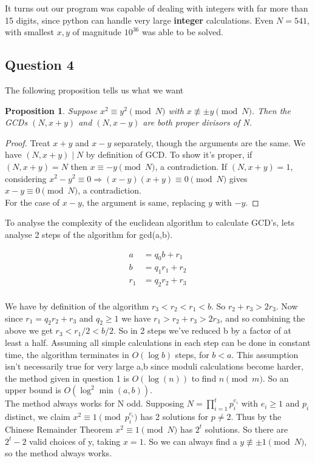 \documentclass[10pt,a4paper]{report}
\newtheorem*{prop}{Proposition}
\begin{document}
It turns out our program was capable of dealing with integers with far more than 15 digits, since python can handle very large \textbf{integer} calculations. Even $N=541$, with smallest $x,y$ of magnitude $10^{36}$ was able to be solved.
 \subsection*{Question 4}

The following proposition tells us what we want

\begin{prop}
Suppose $x^2  \equiv y^2 \pmod N$ with $x \not\equiv \pm y \pmod N$. Then the GCDs $(N, x + y)$ and $(N, x - y)$ are both proper divisors of N.
\end{prop}
\begin{proof}
Treat $x+y$ and $x-y$ separately, though the arguments are the same.
We have $(N, x+y) \mid N$ by definition of GCD. To show it's proper, if $(N, x+y)=N$ then $x\equiv-y\pmod N$, a contradiction. If $(N, x+y)=1$, considering $x^2-y^2\equiv 0\Rightarrow (x-y)(x+y)\equiv 0 \pmod N$ gives $x-y\equiv0 \pmod N$, a contradiction. \\
For the case of $x-y$, the argument is  same, replacing $y$ with $-y$.
\end{proof}

To analyse the complexity of the euclidean algorithm to calculate GCD's, lets analyse 2 steps of the algorithm for gcd(a,b).

\begin{align*}
a&=q_0b+r_1\\
b&=q_1r_1+r_2\\
r_1&=q_2r_2+r_3\\
\end{align*}

We have by definition of the algorithm $ r_3 < r_2 < r_1 < b$. So $r_2 + r_3 > 2r_3$. Now since $r_1=q_2r_2+r_3$ and $q_2\geq 1$ we have $r_1 > r_2 + r_3 > 2r_3$, and so combining the above we get $r_3 < r_1/2 < b/2$. So in 2 steps we've reduced b by a factor of at least a half. Assuming all simple calculations in each step can be done in constant time, the algorithm terminates in $O(\log{b})$ steps, for $b<a$. This assumption isn't necessarily true for very large a,b since moduli calculations become harder, the method given in question 1 is $O(\log(n))$ to find $n \pmod m$. So an upper bound is  $O(\log^2{\min(a,b)})$.\\


The method always works for N odd. Supposing $N=\prod_{i=1}^t p_i^{e_i}$ with $e_i\geq1$ and $p_i$ distinct, we claim $x^2 \equiv 1 \pmod{p_i^{e_i}}$ has 2 solutions for $p\neq2$. Thus by the Chinese Remainder Theorem $x^2\equiv 1 \pmod N$ has $2^t$ solutions. So there are $2^t-2$ valid choices of y, taking $x=1$. So we can always find a $y\not\equiv \pm1 \pmod N$, so the method always works.\\
\end{document}
